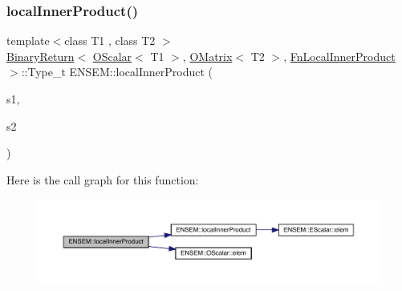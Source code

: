 \subsubsection{\texorpdfstring{localInnerProduct()}{localInnerProduct()}\hspace{0.1cm}{\footnotesize\ttfamily [3/3]}}
{\footnotesize\ttfamily template$<$class T1 , class T2 $>$ \\
\mbox{\hyperlink{structENSEM_1_1BinaryReturn}{Binary\+Return}}$<$ \mbox{\hyperlink{classENSEM_1_1OScalar}{O\+Scalar}}$<$ T1 $>$, \mbox{\hyperlink{classENSEM_1_1OMatrix}{O\+Matrix}}$<$ T2 $>$, \mbox{\hyperlink{structENSEM_1_1FnLocalInnerProduct}{Fn\+Local\+Inner\+Product}} $>$\+::Type\+\_\+t E\+N\+S\+E\+M\+::local\+Inner\+Product (\begin{DoxyParamCaption}\item[{const \mbox{\hyperlink{classENSEM_1_1OScalar}{O\+Scalar}}$<$ T1 $>$ \&}]{s1,  }\item[{const \mbox{\hyperlink{classENSEM_1_1OMatrix}{O\+Matrix}}$<$ T2 $>$ \&}]{s2 }\end{DoxyParamCaption})\hspace{0.3cm}{\ttfamily [inline]}}

Here is the call graph for this function\+:\nopagebreak
\begin{figure}[H]
\begin{center}
\leavevmode
\includegraphics[width=350pt]{d8/d55/group__obsmatrix_gac43a43c02ea508251047ef46cbc6924c_cgraph}
\end{center}
\end{figure}
\mbox{\label{group__obsmatrix_gacc55b39949beec3cc3690b3c892801d2}} 
